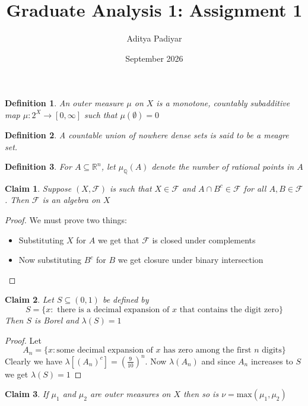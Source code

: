 \documentclass[a4paper,11pt]{article}
\title{Graduate Analysis 1: Assignment 1}
\author{Aditya Padiyar}
\date{September 2026}
\newtheorem{claim}{Claim}
\newtheorem{definition}{Definition}
\begin{document}
\maketitle

\begin{definition}
  An outer measure $\mu$ on $X$ is a monotone, countably subadditive map $\mu:2^X \to [0,\infty]$ such that $\mu(\emptyset)=0$ 
\end{definition}

\begin{definition}
  A countable union of nowhere dense sets is said to be a meagre set.
\end{definition}

\begin{definition}
  For $A \subseteq \mathbb{R}^n$, let $\mu_\mathbb{Q}(A)$ denote the number of rational points in $A$
\end{definition}

\begin{claim}
  Suppose $(X,\mathcal{F})$ is such that $X \in \mathcal{F}$ and $A \cap B^c \in \mathcal{F}$ for all $A,B \in \mathcal{F}$. Then $\mathcal{F}$ is an algebra on $X$
\end{claim}

\begin{proof} We must prove two things:
  \begin{itemize}
    \item Substituting $X$ for $A$ we get that $\mathcal{F}$ is closed under complements
    \item Now substituting $B^c$ for $B$ we get closure under binary intersection
  \end{itemize}
\end{proof}

\begin{claim}
  Let $S \subseteq (0,1)$ be defined by \[S = \{x: \text{ there is a decimal expansion of }x \text{ that contains the digit zero}\}\]
  Then $S$ is Borel and $\lambda(S)=1$
\end{claim}

\begin{proof}
  Let \[A_n=\{x: \text{some decimal expansion of }x\text{ has zero among the first }n\text{ digits} \}\] 
  Clearly we have $\lambda[(A_n)^c]=(\frac{9}{10})^n$. Now $\lambda(A_n)$ and since $A_n$ increases to $S$ we get $\lambda(S)=1$
\end{proof}

\begin{claim}
  If $\mu_1$ and $\mu_2$ are outer measures on $X$ then so is $\nu = \text{max}(\mu_1,\mu_2)$ 
\end{claim}
\end{document}
